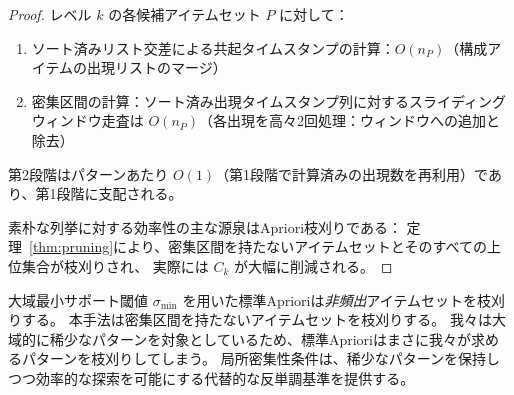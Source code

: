 \begin{proof}
レベル $k$ の各候補アイテムセット $P$ に対して：
\begin{enumerate}
\item ソート済みリスト交差による共起タイムスタンプの計算：$O(n_P)$（構成アイテムの出現リストのマージ）
\item 密集区間の計算：ソート済み出現タイムスタンプ列に対するスライディングウィンドウ走査は $O(n_P)$（各出現を高々2回処理：ウィンドウへの追加と除去）
\end{enumerate}
第2段階はパターンあたり $O(1)$（第1段階で計算済みの出現数を再利用）であり、第1段階に支配される。

素朴な列挙に対する効率性の主な源泉はApriori枝刈りである：
定理~\ref{thm:pruning}により、密集区間を持たないアイテムセットとそのすべての上位集合が枝刈りされ、
実際には $C_k$ が大幅に削減される。
\end{proof}

\begin{remark}[標準Aprioriとの比較]
大域最小サポート閾値 $\sigma_{\min}$ を用いた標準Aprioriは\emph{非頻出}アイテムセットを枝刈りする。
本手法は密集区間を持たないアイテムセットを枝刈りする。
我々は大域的に稀少なパターンを対象としているため、標準Aprioriはまさに我々が求めるパターンを枝刈りしてしまう。
局所密集性条件は、稀少なパターンを保持しつつ効率的な探索を可能にする代替的な反単調基準を提供する。
\end{remark}
